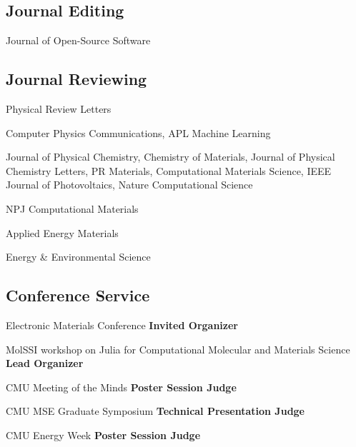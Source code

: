 \subsection{Journal Editing}
{}
{Journal of Open-Source Software}
{}

\vspace{-1mm}
\subsection{Journal Reviewing}

                      {}
                      {Physical Review Letters}
                      {}

{}
{Computer Physics Communications, APL Machine Learning}
{}

{}
{Journal of Physical Chemistry, Chemistry of Materials, Journal of Physical Chemistry Letters, PR Materials, Computational Materials Science, IEEE Journal of Photovoltaics, Nature Computational Science}
{}

{}
{NPJ Computational Materials}
{}

{}
{Applied Energy Materials}
{}

{}
{Energy \& Environmental Science}
{}

\vspace{-1mm}
\subsection{Conference Service}

{Electronic Materials Conference}
{\textbf{Invited Organizer}}
{}

{MolSSI workshop on Julia for Computational Molecular and Materials Science}
{\textbf{Lead Organizer}}
{}

{CMU Meeting of the Minds}
{\textbf{Poster Session Judge}}
{}


{CMU MSE Graduate Symposium}
{\textbf{Technical Presentation Judge}}
{}

{CMU Energy Week}
{\textbf{Poster Session Judge}}
{}


